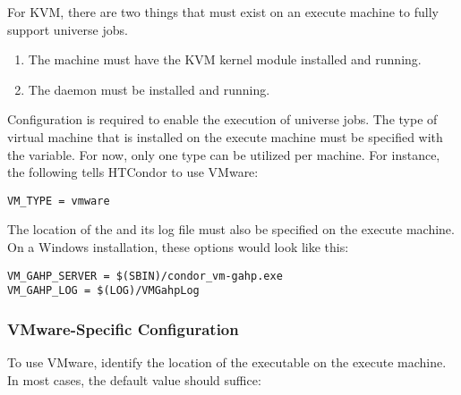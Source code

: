 For KVM, there are two things that must exist on
an execute machine to fully support  universe jobs. 
\begin{enumerate}
\item
The machine must have the KVM kernel module installed and running.

\item
The  daemon must be installed and running.

\end{enumerate}

Configuration is required to enable the execution of
 universe jobs.
The type of virtual machine that is installed on the
execute machine must be specified with the  variable. 
For now, only one type can be utilized per machine.
For instance, the following tells HTCondor to use VMware:

\begin{verbatim}
VM_TYPE = vmware
\end{verbatim}

The location of the  and
its log file must also be specified on the execute machine.
On a Windows installation, these options would look like this:

\begin{verbatim}
VM_GAHP_SERVER = $(SBIN)/condor_vm-gahp.exe
VM_GAHP_LOG = $(LOG)/VMGahpLog
\end{verbatim}




\subsubsection{VMware-Specific Configuration}

To use VMware, identify the location of the  executable
on the execute machine.
In most cases, the default value should suffice:

